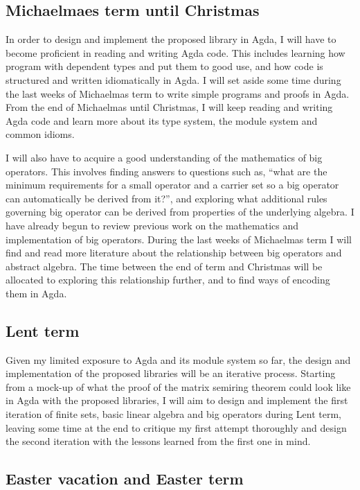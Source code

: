 \documentclass[a4paper]{scrartcl}
\begin{document}
\subsection{Michaelmaes term until Christmas}

In order to design and implement the proposed library in Agda, I will have to become proficient in reading and writing Agda code. This includes learning how program with dependent types and put them to good use, and how code is structured and written idiomatically in Agda. I will set aside some time during the last weeks of Michaelmas term to write simple programs and proofs in Agda. From the end of Michaelmas until Christmas, I will keep reading and writing Agda code and learn more about its type system, the module system and common idioms.

I will also have to acquire a good understanding of the mathematics of big operators. This involves finding answers to questions such as, \enquote{what are the minimum requirements for a small operator and a carrier set so a big operator can automatically be derived from it?}, and exploring what additional rules governing big operator can be derived from properties of the underlying algebra. I have already begun to review previous work on the mathematics and implementation of big operators. During the last weeks of Michaelmas term I will find and read more literature about the relationship between big operators and abstract algebra. The time between the end of term and Christmas will be allocated to exploring this relationship further, and to find ways of encoding them in Agda.

\subsection{Lent term}

Given my limited exposure to Agda and its module system so far, the design and implementation of the proposed libraries will be an iterative process.
Starting from a mock-up of what the proof of the matrix semiring theorem could look like in Agda with the proposed libraries, I will aim to design and implement the first iteration of finite sets, basic linear algebra and big operators during Lent term, leaving some time at the end to critique my first attempt thoroughly and design the second iteration with the lessons learned from the first one in mind.

\subsection{Easter vacation and Easter term}
\end{document}
